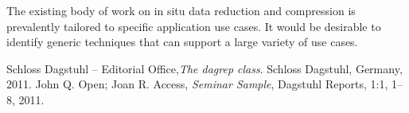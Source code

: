 The existing body of work on in situ data reduction and compression is prevalently tailored to specific application use cases. It would be desirable to identify generic techniques that can support a large variety of use cases.

\begin{thebibliography}{0}
 Schloss Dagstuhl -- Editorial Office,\textsl{The dagrep class}. Schloss Dagstuhl, Germany, 2011.
 John Q. Open; Joan R. Access, \textsl{Seminar Sample}, Dagstuhl Reports, 1:1, 1--8, 2011.
\end{thebibliography}



